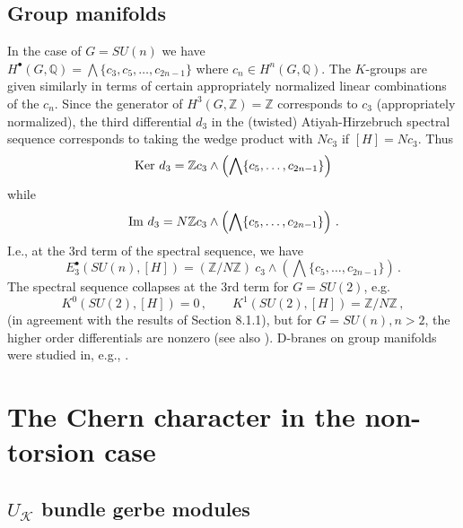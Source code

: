 \documentclass[a4paper,reqno]{amsart}
\theoremstyle{plain}
\theoremstyle{definition}
\theoremstyle{remark}
\numberwithin{equation}{section}
\numberwithin{figure}{section}
\newcommand{\ZZ}{{\mathbb Z}}
\newcommand{\QQ}{{\mathbb Q}}
\newcommand{\<}{\langle}
\renewcommand{\>}{\rangle}
\begin{document}
\subsection{Group manifolds}

In the case of $G=SU(n)$ we have \\
$H^\bullet(G,\QQ) = \bigwedge \{ c_3,c_5,\ldots,c_{2n-1} \}$
where $c_n\in H^n(G,\QQ)$.  The $K$-groups are given similarly in
terms of certain appropriately normalized linear combinations of the
$c_n$.  Since the generator of $H^3(G,\ZZ)=\ZZ$ corresponds to
$c_3$  (appropriately normalized), the third differential $d_3$ in the
(twisted) Atiyah-Hirzebruch spectral sequence corresponds to taking the
wedge product with $Nc_3$ if $[H]=Nc_3$.
Thus
\begin{equation}
{\rm Ker} \ d_3 = \ZZ c_3 \wedge \left( \bigwedge \{ c_5,\ldots,c_{2n-1} \}
       \right)
\end{equation}
while
\begin{equation}
{\rm Im} \ d_3 = N \ZZ c_3 \wedge \left( \bigwedge \{ c_5,\ldots,c_{2n-1} \}
       \right) \,.
\end{equation}
I.e., at the 3rd term of the spectral sequence, we have
\begin{equation}
E_3^\bullet(SU(n),[H]) = (\ZZ/N\ZZ) \ c_3 \wedge \left(
\bigwedge \{ c_5,\ldots,c_{2n-1} \} \right) \,.
\end{equation}
The spectral sequence collapses at the 3rd term for $G=SU(2)$, e.g.
\begin{equation}
K^0(SU(2),[H])  = 0\,, \qquad  K^1(SU(2),[H])  = \ZZ/N\ZZ\,, 
\end{equation}
(in agreement with the results of Section 8.1.1), but for 
$G=SU(n), n>2$, the higher order differentials are nonzero
\cite{Hop} (see also \cite{MalMooSei}).
D-branes on group manifolds were studied in, e.g.,
\cite{AlSc,FigSta,FS}.


\section{The Chern character in the non-torsion case} 

\subsection{$U_{\mathcal{K}}$ bundle gerbe modules} 
\end{document}
